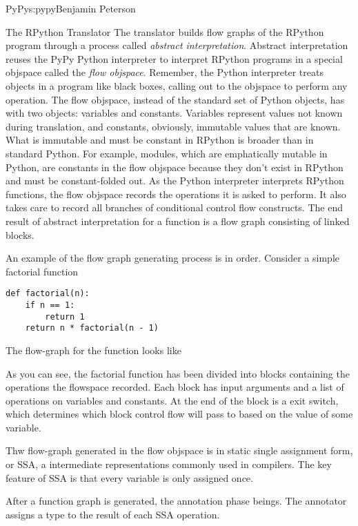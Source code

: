 \begin{aosachapter}{PyPy}{s:pypy}{Benjamin Peterson}
\begin{aosasect1}{The RPython Translator}
The translator builds flow graphs of the RPython program through a process
called \emph{abstract interpretation}. Abstract interpretation reuses the PyPy
Python interpreter to interpret RPython programs in a special objspace called
the \emph{flow objspace}. Remember, the Python interpreter treats objects in a
program like black boxes, calling out to the objspace to perform any
operation. The flow objspace, instead of the standard set of Python objects, has
with two objects: variables and constants. Variables represent values not known
during translation, and constants, obviously, immutable values that are
known. What is immutable and must be constant in RPython is broader than in
standard Python. For example, modules, which are emphatically mutable in Python,
are constants in the flow objspace because they don't exist in RPython and must
be constant-folded out. As the Python interpreter interprets RPython functions,
the flow objspace records the operations it is asked to perform. It also takes
care to record all branches of conditional control flow constructs. The end
result of abstract interpretation for a function is a flow graph consisting of
linked blocks.

An example of the flow graph generating process is in order. Consider a simple
factorial function

\begin{verbatim}
def factorial(n):
    if n == 1:
        return 1
    return n * factorial(n - 1)
\end{verbatim}

The flow-graph for the function looks like 


As you can see, the factorial function has been divided into blocks containing
the operations the flowspace recorded. Each block has input arguments and a list
of operations on variables and constants. At the end of the block is a exit
switch, which determines which block control flow will pass to based on the
value of some variable.

Thw flow-graph generated in the flow objspace is in static single assignment
form, or SSA, a intermediate representations commonly used in compilers. The key
feature of SSA is that every variable is only assigned once.

After a function graph is generated, the annotation phase beings. The annotator
assigns a type to the result of each SSA operation.


\end{aosasect1}
\end{aosachapter}
